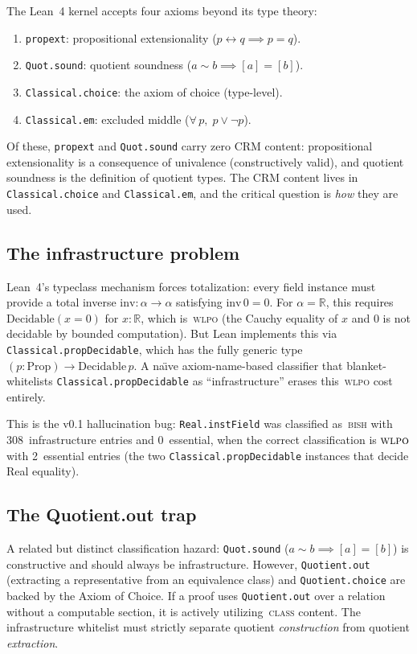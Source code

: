 \documentclass[12pt, a4paper]{article}
\theoremstyle{plain}
\theoremstyle{definition}
\theoremstyle{remark}
\newcommand{\BISH}{\textsc{bish}}
\newcommand{\WLPO}{\textsc{wlpo}}
\newcommand{\CLASS}{\textsc{class}}
\begin{document}
The Lean~4 kernel accepts four axioms beyond its type theory:
\begin{enumerate}[nosep]
  \item \texttt{propext}: propositional extensionality ($p \leftrightarrow q \implies p = q$).
  \item \texttt{Quot.sound}: quotient soundness ($a \sim b \implies [a] = [b]$).
  \item \texttt{Classical.choice}: the axiom of choice (type-level).
  \item \texttt{Classical.em}: excluded middle ($\forall\,p,\; p \lor \lnot p$).
\end{enumerate}
Of these, \texttt{propext} and \texttt{Quot.sound} carry zero CRM
content: propositional extensionality is a consequence of
univalence (constructively valid), and quotient soundness is
the definition of quotient types.  The CRM content lives in
\texttt{Classical.choice} and \texttt{Classical.em}, and the
critical question is \emph{how} they are used.

\subsection{The infrastructure problem}

Lean~4's typeclass mechanism forces totalization: every field
instance must provide a total inverse $\mathrm{inv} : \alpha \to \alpha$
satisfying $\mathrm{inv}\,0 = 0$.  For $\alpha = \mathbb{R}$, this
requires $\mathrm{Decidable}(x = 0)$ for $x : \mathbb{R}$, which
is~\WLPO{} (the Cauchy equality of $x$ and $0$ is not decidable by
bounded computation).  But Lean implements this via
\texttt{Classical.propDecidable}, which has the fully generic type
$(p : \mathrm{Prop}) \to \mathrm{Decidable}\,p$.  A na\"{\i}ve
axiom-name-based classifier that blanket-whitelists
\texttt{Classical.propDecidable} as ``infrastructure'' erases
this~\WLPO{} cost entirely.

This is the v0.1 hallucination bug: \texttt{Real.instField} was
classified as~\BISH{} with 308~infrastructure entries and
0~essential, when the correct classification is $\WLPO$ with
2~essential entries (the two \texttt{Classical.propDecidable}
instances that decide Real equality).

\subsection{The Quotient.out trap}

A related but distinct classification hazard:
\texttt{Quot.sound} ($a \sim b \implies [a] = [b]$) is
constructive and should always be infrastructure.  However,
\texttt{Quotient.out} (extracting a representative from an
equivalence class) and \texttt{Quotient.choice} are backed by
the Axiom of Choice.  If a proof uses \texttt{Quotient.out}
over a relation without a computable section, it is actively
utilizing~\CLASS{} content.  The infrastructure whitelist must
strictly separate quotient \emph{construction} from quotient
\emph{extraction}.
\end{document}
